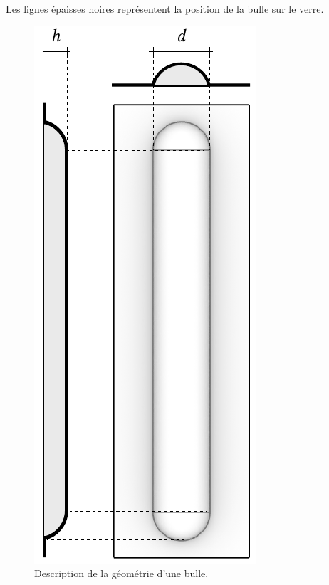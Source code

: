 \documentclass[11pt,titlepage]{article}
\begin{document}
Les lignes épaisses noires représentent la position de la bulle sur le verre. 

\begin{figure}
    \centering
    \includegraphics[width=0.8\linewidth]{img/bulle/geo_bulles1.pdf}
    \caption{Description de la géométrie d'une bulle.}
    \label{fig:geo_bulle1}
    \vspace{-10pt}
    \end{figure}
\end{document}

